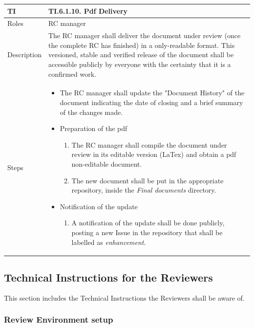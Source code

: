 \documentclass{template/openetcs_article}
\begin{document}
\begin{flushleft}
\tablefirsthead{}
\tablehead{}
\tabletail{}
\tablelasttail{}
\begin{supertabular}{|m{2cm}|m{13cm}|}
\hline
{}
TI & 
TI.6.1.10. Pdf Delivery
\\\hline
Roles &
RC manager
\\\hline
Description &
The RC manager shall deliver the document under review (once the complete RC has finished) in a only-readable format. This versioned, stable and verified release of the document shall be accessible publicly by everyone with the certainty that it is a confirmed work.
\\\hline
Steps &
\begin{itemize}
\item The RC manager shall update the "Document History" of the document indicating the date of closing and a brief summary of the changes made. 
\item Preparation of the pdf
\begin{enumerate}
\item The RC manager shall compile the document under review in its editable version (LaTex) and obtain a pdf non-editable document.
\item The new document shall be put in the appropriate repository, inside the {\it Final documents} directory.
\end{enumerate}
\item Notification of the update
\begin{enumerate}
\item A notification of the update shall be done publicly, posting a new Issue in the repository that shall be labelled as {\it enhancement}. 
\end{enumerate}
\end{itemize}
\\\hline
\end{supertabular}
\end{flushleft}

\subsection{Technical Instructions for the Reviewers}

This section includes the Technical Instructions the Reviewers shall be aware of.

\subsubsection{Review Environment setup}
\end{document}
